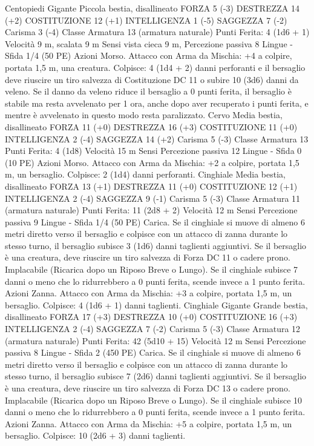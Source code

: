 \begin{multicols}{2}
Centopiedi Gigante
Piccola bestia, disallineato
FORZA 5 (-3)
DESTREZZA 14 (+2)
COSTITUZIONE 12 (+1)
INTELLIGENZA 1 (-5)
SAGGEZZA 7 (-2)
Carisma 3 (-4)
Classe Armatura 13 (armatura naturale)
\hspace*{0pt}\hfill{Punti Ferita}: 4 (1d6 + 1)
Velocità 9 m, scalata 9 m
Sensi vista cieca 9 m, Percezione passiva 8
Lingue -
Sfida 1/4 (50 PE)
Azioni
Morso. Attacco con Arma da Mischia: +4 a colpire, portata 1,5
m, una creatura.
Colpisce: 4 (1d4 + 2) danni perforanti e il bersaglio deve riuscire
un tiro salvezza di Costituzione DC 11 o subire 10 (3d6) danni
da veleno. Se il danno da veleno riduce il bersaglio a 0 punti
ferita, il bersaglio è stabile ma resta avvelenato per 1 ora, anche
dopo aver recuperato i punti ferita, e mentre è avvelenato in
questo modo resta paralizzato.
Cervo
Media bestia, disallineato
FORZA 11 (+0)
DESTREZZA 16 (+3)
COSTITUZIONE 11 (+0)
INTELLIGENZA 2 (-4)
SAGGEZZA 14 (+2)
Carisma 5 (-3)
Classe Armatura 13
\hspace*{0pt}\hfill{Punti Ferita}: 4 (1d8)
Velocità 15 m
Sensi Percezione passiva 12
Lingue -
Sfida 0 (10 PE)
Azioni
Morso. Attacco con Arma da Mischia: +2 a colpire, portata 1,5
m, un bersaglio.
Colpisce: 2 (1d4) danni perforanti.
Cinghiale
Media bestia, disallineato
FORZA 13 (+1)
DESTREZZA 11 (+0)
COSTITUZIONE 12 (+1)
INTELLIGENZA 2 (-4)
SAGGEZZA 9 (-1)
Carisma 5 (-3)
Classe Armatura 11 (armatura naturale)
\hspace*{0pt}\hfill{Punti Ferita}: 11 (2d8 + 2)
Velocità 12 m
Sensi Percezione passiva 9
Lingue -
Sfida 1/4 (50 PE)
Carica. Se il cinghiale si muove di almeno 6 metri diretto verso
il bersaglio e colpisce con un attacco di zanna durante lo stesso
turno, il bersaglio subisce 3 (1d6) danni taglienti aggiuntivi. Se il
bersaglio è una creatura, deve riuscire un tiro salvezza di Forza
DC 11 o cadere prono.
Implacabile (Ricarica dopo un Riposo Breve o Lungo). Se il
cinghiale subisce 7 danni o meno che lo ridurrebbero a 0 punti
ferita, scende invece a 1 punto ferita.
Azioni
Zanna. Attacco con Arma da Mischia: +3 a colpire, portata 1,5
m, un bersaglio.
Colpisce: 4 (1d6 + 1) danni taglienti.
Cinghiale Gigante
Grande bestia, disallineato
FORZA 17 (+3)
DESTREZZA 10 (+0)
COSTITUZIONE 16 (+3)
INTELLIGENZA 2 (-4)
SAGGEZZA 7 (-2)
Carisma 5 (-3)
Classe Armatura 12 (armatura naturale)
\hspace*{0pt}\hfill{Punti Ferita}: 42 (5d10 + 15)
Velocità 12 m
Sensi Percezione passiva 8
Lingue -
Sfida 2 (450 PE)
Carica. Se il cinghiale si muove di almeno 6 metri diretto verso
il bersaglio e colpisce con un attacco di zanna durante lo stesso
turno, il bersaglio subisce 7 (2d6) danni taglienti aggiuntivi. Se il
bersaglio è una creatura, deve riuscire un tiro salvezza di Forza
DC 13 o cadere prono.
Implacabile (Ricarica dopo un Riposo Breve o Lungo). Se il
cinghiale subisce 10 danni o meno che lo ridurrebbero a 0 punti
ferita, scende invece a 1 punto ferita.
Azioni
Zanna. Attacco con Arma da Mischia: +5 a colpire, portata 1,5
m, un bersaglio.
Colpisce: 10 (2d6 + 3) danni taglienti.
 

\end{multicols}
